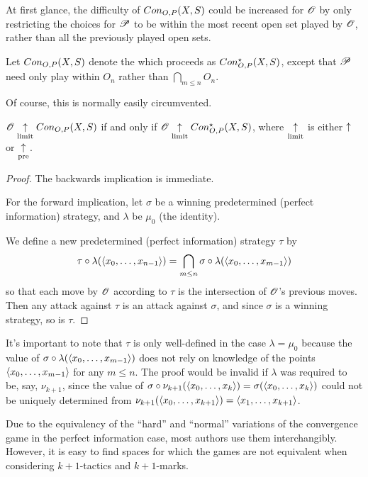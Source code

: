 At first glance, the difficulty of $Con_{O,P}(X,S)$ could be increased for
$\mathscr{O}$ by only restricting the choices for $\mathscr{P}$ to be within the most
recent open set played by $\mathscr{O}$, rather than all the previously played
open sets.

\begin{defn}
  Let $Con_{O,P}(X,S)$ denote the  which proceeds
  as $Con_{O,P}^\star(X,S)$, except that $\mathscr{P}$ need only play within $O_n$
  rather than $\bigcap_{m\leq n}O_n$.
\end{defn}

Of course, this is normally easily circumvented.

\begin{prop}
  $\mathscr{O} \underset{\text{limit}}{\uparrow} Con_{O,P}(X,S)$
    if and only if
  $\mathscr{O} \underset{\text{limit}}{\uparrow} Con_{O,P}^\star(X,S)$,
  where $\underset{\text{limit}}{\uparrow}$ is either $\uparrow$ or $\underset{\text{pre}}{\uparrow}$.
\end{prop}

\begin{proof}
  The backwards implication is immediate.

  For the forward implication, let $\sigma$ be a winning predetermined
  (perfect information) strategy, and $\lambda$ be $\mu_0$ (the identity).

  We define a new predetermined (perfect information) strategy $\tau$ by
    \[
      \tau\circ\lambda(\langle x_0,\dots,x_{n-1}\rangle)
        =
      \bigcap_{m\leq n}\sigma\circ\lambda(\langle x_0,\dots,x_{m-1}\rangle)
    \]
  so that each move by $\mathscr{O}$ according to $\tau$ is the intersection of
  $\mathscr{O}$'s previous moves. Then any attack against $\tau$ is an attack
  against $\sigma$, and since $\sigma$ is a winning strategy, so is $\tau$.
\end{proof}

It's important to note that $\tau$ is only well-defined in the case
$\lambda=\mu_0$ because the value of
$\sigma\circ\lambda(\langle x_0,\dots,x_{m-1}\rangle)$ does not rely on knowledge of the
points $\langle x_0,\dots,x_{m-1}\rangle$ for any $m\leq n$.
The proof would be invalid if $\lambda$ was required to be, say,
$\nu_{k+1}$, since the value of
$\sigma\circ\nu_{k+1}(\langle x_0,\dots,x_k\rangle)=\sigma(\langle x_0,\dots,x_k\rangle)$
could not be uniquely determined from
$\nu_{k+1}(\langle x_0,\dots,x_{k+1}\rangle)=\langle x_1,\dots,x_{k+1}\rangle$.

Due to the equivalency of the ``hard'' and ``normal'' variations of the
convergence game in the perfect information case, most authors use them
interchangibly. However, it is easy to find spaces for which the games are
not equivalent when considering $k+1$-tactics and $k+1$-marks.

